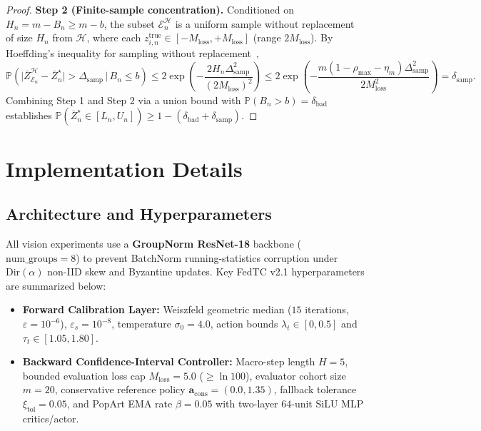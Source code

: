 \begin{proof}
\textbf{Step 2 (Finite-sample concentration).}
Conditioned on $H_n = m - B_n \ge m - b$, the subset $\mathcal{E}_n^{\mathcal{H}}$ is a uniform sample without replacement of size $H_n$ from $\mathcal{H}$, where each $z_{i,n}^{\mathrm{true}} \in [-M_{\mathrm{loss}}, +M_{\mathrm{loss}}]$ (range $2M_{\mathrm{loss}}$). By Hoeffding's inequality for sampling without replacement~\cite{kairouz2019advances},
\[
\mathbb{P}\!\left(\big|\bar{Z}_{\mathcal{E}_n}^{\mathcal{H}} - \bar{Z}_n^\star\big| > \Delta_{\mathrm{samp}} \,\Big|\, B_n \le b\right)
\le 2\exp\!\left(-\frac{2 H_n \Delta_{\mathrm{samp}}^2}{(2M_{\mathrm{loss}})^2}\right)
\le 2\exp\!\left(-\frac{m(1-\rho_{\max}-\eta_m)\Delta_{\mathrm{samp}}^2}{2 M_{\mathrm{loss}}^2}\right)
= \delta_{\mathrm{samp}}.
\]
Combining Step 1 and Step 2 via a union bound with $\mathbb{P}(B_n > b) = \delta_{\mathrm{bad}}$ establishes $\mathbb{P}(\bar{Z}_n^\star \in [L_n, U_n]) \ge 1 - (\delta_{\mathrm{bad}} + \delta_{\mathrm{samp}})$.
\end{proof}

\section{Implementation Details}
\label{app:impl}

\subsection{Architecture and Hyperparameters}
All vision experiments use a \textbf{GroupNorm ResNet-18} backbone ($\mathrm{num\_groups}=8$) to prevent BatchNorm running-statistics corruption under $\mathrm{Dir}(\alpha)$ non-IID skew and Byzantine updates. Key FedTC v2.1 hyperparameters are summarized below:
\begin{itemize}
    \item \textbf{Forward Calibration Layer:} Weiszfeld geometric median ($15$ iterations, $\varepsilon = 10^{-6}$), $\varepsilon_s = 10^{-8}$, temperature $\sigma_0 = 4.0$, action bounds $\lambda_t \in [0, 0.5]$ and $\tau_t \in [1.05, 1.80]$.
    \item \textbf{Backward Confidence-Interval Controller:} Macro-step length $H = 5$, bounded evaluation loss cap $M_{\mathrm{loss}} = 5.0$ ($\ge \ln 100$), evaluator cohort size $m = 20$, conservative reference policy $\mathbf{a}_{\mathrm{cons}} = (0.0, 1.35)$, fallback tolerance $\xi_{\mathrm{tol}} = 0.05$, and PopArt EMA rate $\beta = 0.05$ with two-layer $64$-unit SiLU MLP critics/actor.
\end{itemize}
